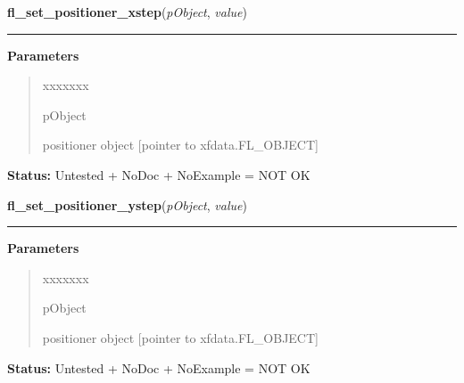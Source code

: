 \hspace{.8\funcindent}\begin{boxedminipage}{\funcwidth}

    \raggedright \textbf{fl\_set\_positioner\_xstep}(\textit{pObject}, \textit{value})

    \vspace{-1.5ex}

    \rule{\textwidth}{0.5\fboxrule}
\setlength{\parskip}{2ex}
\setlength{\parskip}{1ex}
      \textbf{Parameters}
      \vspace{-1ex}

      \begin{quote}
        \begin{Ventry}{xxxxxxx}

          \item[pObject]

          positioner object [pointer to xfdata.FL\_OBJECT]

        \end{Ventry}

      \end{quote}

\textbf{Status:} Untested + NoDoc + NoExample = NOT OK



    \end{boxedminipage}

    \label{xformslib:library:fl_set_positioner_ystep}

    \vspace{0.5ex}

\hspace{.8\funcindent}\begin{boxedminipage}{\funcwidth}

    \raggedright \textbf{fl\_set\_positioner\_ystep}(\textit{pObject}, \textit{value})

    \vspace{-1.5ex}

    \rule{\textwidth}{0.5\fboxrule}
\setlength{\parskip}{2ex}
\setlength{\parskip}{1ex}
      \textbf{Parameters}
      \vspace{-1ex}

      \begin{quote}
        \begin{Ventry}{xxxxxxx}

          \item[pObject]

          positioner object [pointer to xfdata.FL\_OBJECT]

        \end{Ventry}

      \end{quote}

\textbf{Status:} Untested + NoDoc + NoExample = NOT OK



    \end{boxedminipage}

